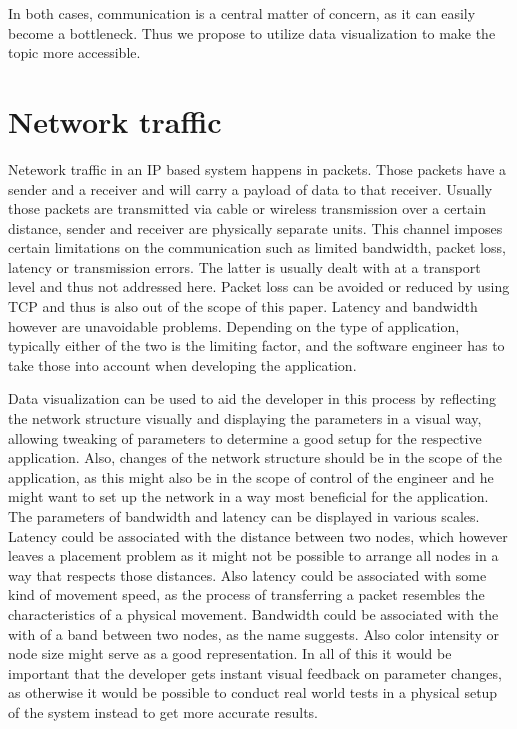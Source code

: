 \documentclass[]{paper}
\begin{document}
In both cases, communication is a central matter of concern, as it can easily become a bottleneck. Thus we propose to utilize data visualization to make the topic more accessible.

\section{Network traffic}
Netework traffic in an IP based system happens in packets. Those packets have a sender and a receiver and will carry a payload of data to that receiver. Usually those packets are transmitted via cable or wireless transmission over a certain distance, sender and receiver are physically separate units. This channel imposes certain limitations on the communication such as limited bandwidth, packet loss, latency or transmission errors. The latter is usually dealt with at a transport level and thus not addressed here. Packet loss can be avoided or reduced by using TCP and thus is also out of the scope of this paper. Latency and bandwidth however are unavoidable problems. Depending on the type of application, typically either of the two is the limiting factor, and the software engineer has to take those into account when developing the application. 

Data visualization can be used to aid the developer in this process by reflecting the network structure visually and displaying the parameters in a visual way, allowing tweaking of parameters to determine a good setup for the respective application. Also, changes of the network structure should be in the scope of the application, as this might also be in the scope of control of the engineer and he might want to set up the network in a way most beneficial for the application. The parameters of bandwidth and latency can be displayed in various scales. Latency could be associated with the distance between two nodes, which however leaves a placement problem as it might not be possible to arrange all nodes in a way that respects those distances. Also latency could be associated with some kind of movement speed, as the process of transferring a packet resembles the characteristics of a physical movement. Bandwidth could be associated with the with of a band between two nodes, as the name suggests. Also color intensity or node size might serve as a good representation. In all of this it would be important that the developer gets instant visual feedback on parameter changes, as otherwise it would be possible to conduct real world tests in a physical setup of the system instead to get more accurate results.
\end{document}
